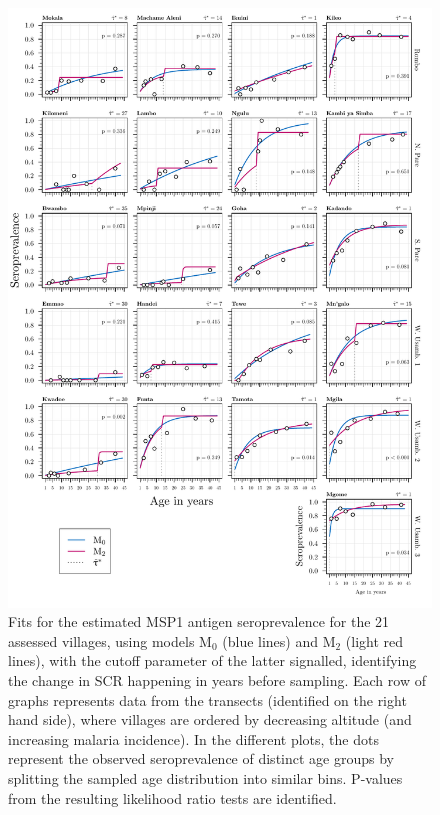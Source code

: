 \begin{figure}[H]
\center
\begin{adjustbox}{width=\linewidth,totalheight=\baselineskip}
\includegraphics[width=\columnwidth]{images/Seroprevalence_M0vM2_msp1.pdf}
\end{adjustbox}
\caption[Estimated MSP1 seroprevalence for models M$_0$ and M$_2$]{Fits for the estimated MSP1 antigen seroprevalence for the 21 assessed villages, using models M$_0$ (blue lines) and M$_2$ (light red lines), with the cutoff parameter of the latter signalled, identifying the change in SCR happening in years before sampling. Each row of graphs represents data from the transects (identified on the right hand side), where villages are ordered by decreasing altitude (and increasing malaria incidence). In the different plots, the dots represent the observed seroprevalence of distinct age groups by splitting the sampled age distribution into similar bins. P-values from the resulting likelihood ratio tests are identified.}
\label{fig:seroprevalence.M0.M2}
\end{figure}


